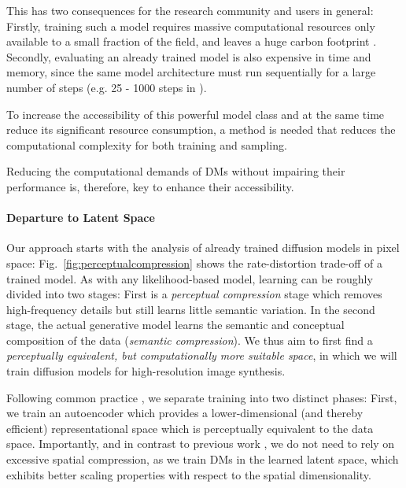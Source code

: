 This has two consequences for the research community and users in general: Firstly, training such a model requires massive computational resources only available to a small fraction of the field, and leaves a huge carbon footprint \cite{DBLP:journals/corr/abs-2104-10350,DBLP:conf/aaai/StrubellGM20}. Secondly, evaluating an already trained model is also expensive in time and memory, since the same model architecture must run sequentially for a large number of steps (e.g. 25 - 1000 steps in \cite{DBLP:journals/corr/abs-2105-05233}).

To increase the accessibility of this powerful model class and at the same time reduce its significant resource consumption, a method is needed that reduces the computational complexity for both training and sampling.

Reducing the computational demands of DMs without impairing their performance is, therefore, key to enhance their accessibility.

\paragraph{Departure to Latent Space}

Our approach starts with the analysis of already trained diffusion models in pixel space: 
Fig.~\ref{fig:perceptualcompression} shows the rate-distortion trade-off of a trained model. As with any likelihood-based model, learning can be roughly divided into two stages: First is a \emph{perceptual compression} stage which removes high-frequency details but still learns little semantic variation. In the second stage, the actual generative model learns the semantic and conceptual composition of the data (\emph{semantic compression}). We thus aim to first find a \textsl{perceptually equivalent, but computationally more suitable space}, in which we will train diffusion models for high-resolution image synthesis. 

Following common practice \cite{DBLP:conf/nips/OordVK17, DBLP:conf/nips/RazaviOV19, DBLP:journals/corr/abs-2012-09841, DBLP:conf/iclr/DaiW19, DBLP:journals/corr/abs-2102-12092}, we separate training into two distinct phases: First, we train an autoencoder which provides a lower-dimensional (and thereby efficient) representational space which is perceptually equivalent to the data space. Importantly, and in contrast to previous work \cite{DBLP:journals/corr/abs-2012-09841, DBLP:journals/corr/abs-2102-12092}, we do not need to rely on excessive spatial compression, as we train DMs in the learned latent space, which exhibits better scaling properties with respect to the spatial dimensionality. 

